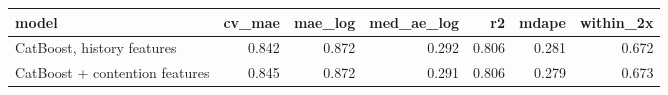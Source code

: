 \begin{tabular}{lrrrrrr}
\toprule
model & cv_mae & mae_log & med_ae_log & r2 & mdape & within_2x \\
\midrule
CatBoost, history features & 0.842 & 0.872 & 0.292 & 0.806 & 0.281 & 0.672 \\
CatBoost + contention features & 0.845 & 0.872 & 0.291 & 0.806 & 0.279 & 0.673 \\
\bottomrule
\end{tabular}
